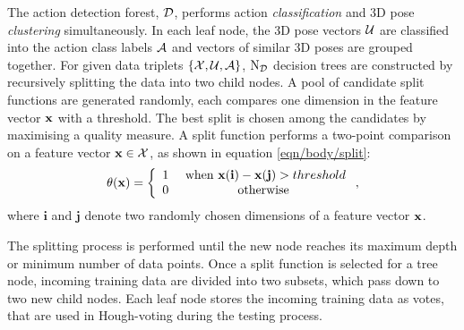 The action detection forest, $\mathcal{D}$, performs action \emph{classification} and 3D pose \emph{clustering} simultaneously.  
In each leaf node, the 3D pose vectors $\mathcal{U}$ are classified into the action class labels $\mathcal{A}$ and vectors of similar 3D poses are grouped together.
For given data triplets $\{\mathcal{X},\mathcal{U}, \mathcal{A}\}$, $\mathrm{N_{\mathcal{D}}}$ decision trees are constructed by recursively splitting the data into two child nodes. 
A pool of candidate split functions are generated randomly, each compares one dimension in the feature vector $\mathbf{x}$ with a threshold. 
The best split is chosen among the candidates by maximising a quality measure. 
A split function performs a two-point comparison on a feature vector $\mathbf{x} \in \mathcal{X}$, as shown in equation \ref{eqn/body/split}: 
\begin{equation}
	\theta(\mathbf{x}) = 
	\left\{
		\begin{array}{lc} 
			1 & \mbox{ when } \mathbf{x}(\mathbf{i}) - \mathbf{x}(\mathbf{j}) > threshold \\  
			0 & \mbox{ otherwise } 
		\end{array}
	\right.,
	\label{eqn/body/split}
\end{equation}
where $\mathbf{i}$ and $\mathbf{j}$ denote two randomly chosen dimensions of a feature vector $\mathbf{x}$. 

The splitting process is performed until the new node reaches its maximum depth or minimum number of data points. 
Once a split function is selected for a tree node, incoming training data are divided into two subsets, which pass down to two new child nodes.  
Each leaf node stores the incoming training data as votes, that are used in Hough-voting during the testing process. 

